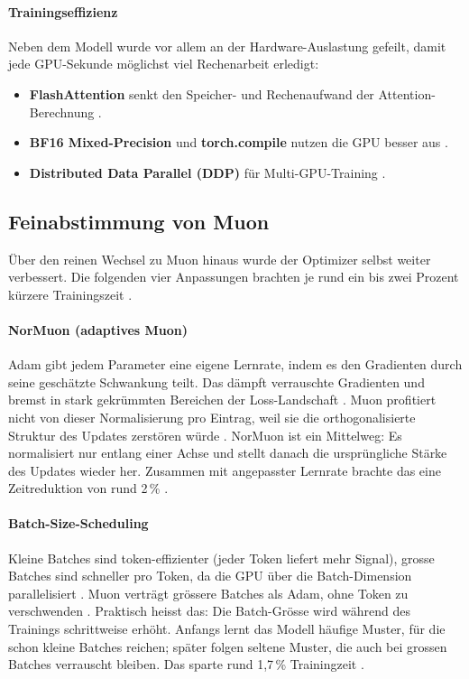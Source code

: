 \paragraph{Trainingseffizienz}
Neben dem Modell wurde vor allem an der Hardware-Auslastung gefeilt, damit jede GPU-Sekunde möglichst viel Rechenarbeit erledigt:
\begin{itemize}
    \item \textbf{FlashAttention} senkt den Speicher- und Rechenaufwand der Attention-Berechnung \cite{keller_modded_nanogpt_2024}.
    \item \textbf{BF16 Mixed-Precision} und \textbf{torch.compile} nutzen die GPU besser aus \cite{keller_modded_nanogpt_2024}.
    \item \textbf{Distributed Data Parallel (DDP)} für Multi-GPU-Training \cite{keller_modded_nanogpt_2024}.
\end{itemize}

\subsection*{Feinabstimmung von Muon}

Über den reinen Wechsel zu Muon hinaus wurde der Optimizer selbst weiter verbessert.
Die folgenden vier Anpassungen brachten je rund ein bis zwei Prozent kürzere Trainingszeit \cite{srivastava_muon_2024}.

\paragraph{NorMuon (adaptives Muon)}
Adam gibt jedem Parameter eine eigene Lernrate, indem es den Gradienten durch seine geschätzte Schwankung teilt. Das dämpft verrauschte Gradienten und bremst in stark gekrümmten Bereichen der Loss-Landschaft \cite{srivastava_muon_2024}.
Muon profitiert nicht von dieser Normalisierung pro Eintrag, weil sie die orthogonalisierte Struktur des Updates zerstören würde \cite{srivastava_muon_2024}.
NorMuon ist ein Mittelweg: Es normalisiert nur entlang einer Achse und stellt danach die ursprüngliche Stärke des Updates wieder her. Zusammen mit angepasster Lernrate brachte das eine Zeitreduktion von rund 2\,\% \cite{srivastava_muon_2024}.

\paragraph{Batch-Size-Scheduling}
Kleine Batches sind token-effizienter (jeder Token liefert mehr Signal), grosse Batches sind schneller pro Token, da die GPU über die Batch-Dimension parallelisiert \cite{srivastava_muon_2024}.
Muon verträgt grössere Batches als Adam, ohne Token zu verschwenden \cite{srivastava_muon_2024}.
Praktisch heisst das: Die Batch-Grösse wird während des Trainings schrittweise erhöht. Anfangs lernt das Modell häufige Muster, für die schon kleine Batches reichen; später folgen seltene Muster, die auch bei grossen Batches verrauscht bleiben. Das sparte rund 1,7\,\% Trainingzeit \cite{srivastava_muon_2024}.

